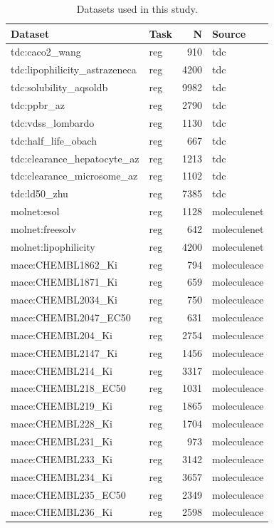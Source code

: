 \begin{table}
\caption{Datasets used in this study.}
\label{tab:table1_datasets}
\begin{tabular}{llrl}
\toprule
Dataset & Task & N & Source \\
\midrule
tdc:caco2\_wang & reg & 910 & tdc \\
tdc:lipophilicity\_astrazeneca & reg & 4200 & tdc \\
tdc:solubility\_aqsoldb & reg & 9982 & tdc \\
tdc:ppbr\_az & reg & 2790 & tdc \\
tdc:vdss\_lombardo & reg & 1130 & tdc \\
tdc:half\_life\_obach & reg & 667 & tdc \\
tdc:clearance\_hepatocyte\_az & reg & 1213 & tdc \\
tdc:clearance\_microsome\_az & reg & 1102 & tdc \\
tdc:ld50\_zhu & reg & 7385 & tdc \\
molnet:esol & reg & 1128 & moleculenet \\
molnet:freesolv & reg & 642 & moleculenet \\
molnet:lipophilicity & reg & 4200 & moleculenet \\
mace:CHEMBL1862\_Ki & reg & 794 & moleculeace \\
mace:CHEMBL1871\_Ki & reg & 659 & moleculeace \\
mace:CHEMBL2034\_Ki & reg & 750 & moleculeace \\
mace:CHEMBL2047\_EC50 & reg & 631 & moleculeace \\
mace:CHEMBL204\_Ki & reg & 2754 & moleculeace \\
mace:CHEMBL2147\_Ki & reg & 1456 & moleculeace \\
mace:CHEMBL214\_Ki & reg & 3317 & moleculeace \\
mace:CHEMBL218\_EC50 & reg & 1031 & moleculeace \\
mace:CHEMBL219\_Ki & reg & 1865 & moleculeace \\
mace:CHEMBL228\_Ki & reg & 1704 & moleculeace \\
mace:CHEMBL231\_Ki & reg & 973 & moleculeace \\
mace:CHEMBL233\_Ki & reg & 3142 & moleculeace \\
mace:CHEMBL234\_Ki & reg & 3657 & moleculeace \\
mace:CHEMBL235\_EC50 & reg & 2349 & moleculeace \\
mace:CHEMBL236\_Ki & reg & 2598 & moleculeace \\

\end{tabular}
\end{table}
